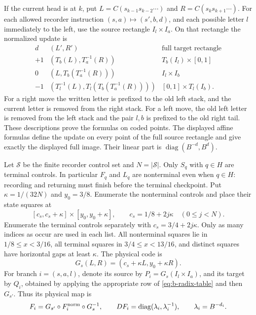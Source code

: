 \documentclass[11pt]{article}
\theoremstyle{remark}
\newcommand{\diag}{\operatorname{diag}}
\begin{document}
If the current head is at $k$, put
$L=C(s_{k-1}s_{k-2}\cdots)$ and $R=C(s_ks_{k+1}\cdots)$.
For each allowed recorder instruction
$(s,a)\mapsto(s',b,d)$, and each possible letter $l$ immediately to the
left, use the source rectangle $I_l\times I_a$. On that rectangle the
normalized update is
\begin{equation}\label{eq:b-radix-table}
\begin{array}{c|c|c}
 d&(L',R')&\text{full target rectangle}\\\hline
 +1&(T_b(L),T_a^{-1}(R))&T_b(I_l)\times[0,1]\\
 0&(L,T_b(T_a^{-1}(R)))&I_l\times I_b\\
 -1&(T_l^{-1}(L),T_l(T_b(T_a^{-1}(R))))
       &[0,1]\times T_l(I_b).
\end{array}
\end{equation}
For a right move the written letter is prefixed to the old left stack,
and the current letter is removed from the right stack. For a left move,
the old left letter is removed from the left stack and the pair $l,b$ is
prefixed to the old right tail. These descriptions prove the formulas on
coded points. The displayed affine formulas define the update on every
point of the full source rectangle and give exactly the displayed full
image. Their linear part is $\diag(B^{-d},B^d)$.

Let $\mathcal S$ be the finite recorder control set and $N=|\mathcal S|$.
Only $S_q$ with $q\in H$ are terminal controls. In particular $F_q$ and
$L_q$ are nonterminal even when $q\in H$: recording and returning must
finish before the terminal checkpoint. Put $\kappa=1/(32N)$ and
$y_0=3/8$. Enumerate the nonterminal controls and place their state squares
at
\[
 [c_s,c_s+\kappa]\times[y_0,y_0+\kappa],
 \qquad c_s=1/8+2j\kappa\quad(0\le j<N).
\]
Enumerate the terminal controls separately with
$c_s=3/4+2j\kappa$. Only as many indices as occur are used in each list.
All nonterminal squares lie in $1/8\le x<3/16$, all terminal squares
in $3/4\le x<13/16$, and distinct squares have horizontal gaps at least
$\kappa$. The physical code is
\begin{equation}\label{eq:b-code}
 G_s(L,R)=(c_s+\kappa L,y_0+\kappa R).
\end{equation}
For branch $i=(s,a,l)$, denote its source by
$P_i=G_s(I_l\times I_a)$, and its target by $Q_i$, obtained by applying
the appropriate row of \eqref{eq:b-radix-table} and then $G_{s'}$.
Thus its physical map is
\[
 F_i=G_{s'}\circ F_i^{\rm norm}\circ G_s^{-1},\qquad
 DF_i=\diag(\lambda_i,\lambda_i^{-1}),\qquad \lambda_i=B^{-d_i}.
\]
\end{document}
